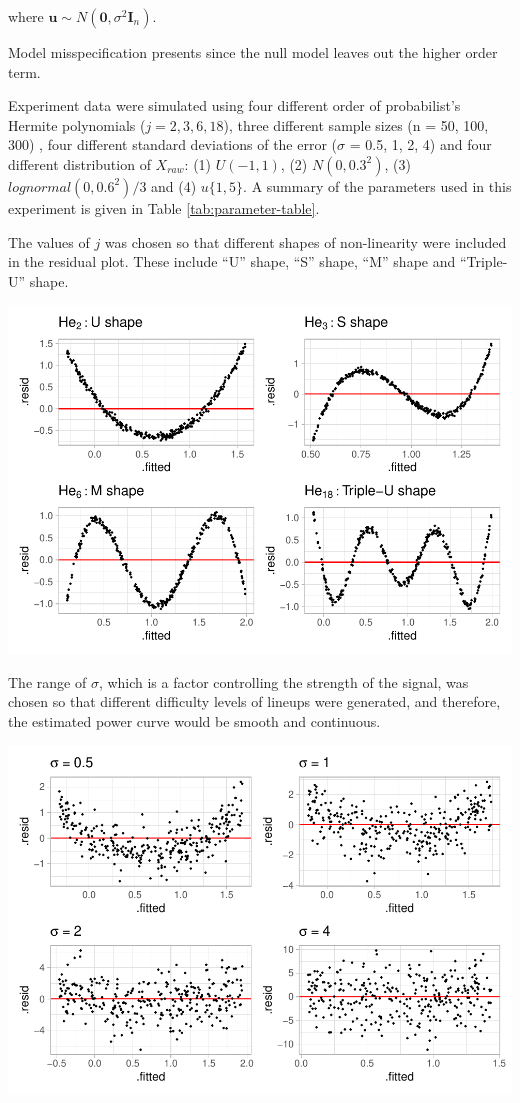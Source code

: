 \documentclass[]{interact}
\theoremstyle{plain}%
\theoremstyle{definition}
\theoremstyle{remark}
\begin{document}
where
\(\boldsymbol{u} \sim N(\boldsymbol{0}, \sigma^2\boldsymbol{I}_n)\).

Model misspecification presents since the null model leaves out the
higher order term.

Experiment data were simulated using four different order of
probabilist's Hermite polynomials (\(j = 2, 3, 6, 18\)), three different
sample sizes (n = 50, 100, 300) , four different standard deviations of
the error (\(\sigma\) = 0.5, 1, 2, 4) and four different distribution of
\(X_{raw}\): (1) \(U(-1, 1)\), (2) \(N(0, 0.3^2)\), (3)
\(lognormal(0, 0.6^2)/3\) and (4) \(u\{1, 5\}\). A summary of the
parameters used in this experiment is given in Table
\ref{tab:parameter-table}.

The values of \(j\) was chosen so that different shapes of non-linearity
were included in the residual plot. These include ``U'' shape, ``S''
shape, ``M'' shape and ``Triple-U'' shape.

\includegraphics{paper_comparison_files/figure-latex/different-shape-of-herimite-1.pdf}

The range of \(\sigma\), which is a factor controlling the strength of
the signal, was chosen so that different difficulty levels of lineups
were generated, and therefore, the estimated power curve would be smooth
and continuous.

\includegraphics{paper_comparison_files/figure-latex/different-sigma-1.pdf}
\end{document}

